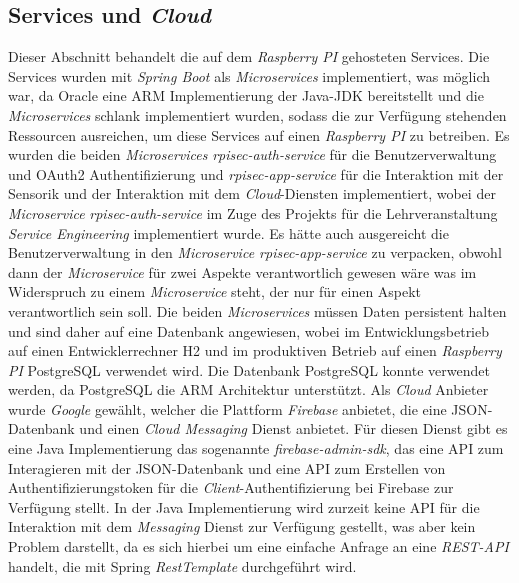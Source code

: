 \documentclass[]{article}
\begin{document}
\subsection{Services und \emph{Cloud}}
Dieser Abschnitt behandelt die auf dem \emph{Raspberry PI} gehosteten Services. Die Services wurden mit \emph{Spring Boot} als \emph{Microservices} implementiert, was möglich war, da Oracle eine ARM Implementierung der Java-JDK bereitstellt und die \emph{Microservices} schlank implementiert wurden, sodass die zur Verfügung stehenden Ressourcen ausreichen, um diese Services auf einen \emph{Raspberry PI} zu betreiben.
\newline
\newline
Es wurden die beiden \emph{Microservices} \emph{rpisec-auth-service} für die Benutzerverwaltung und OAuth2 Authentifizierung und \emph{rpisec-app-service} für die Interaktion mit der Sensorik und der Interaktion mit dem \emph{Cloud}-Diensten implementiert, wobei der \emph{Microservice} \emph{rpisec-auth-service} im Zuge des Projekts für die Lehrveranstaltung \emph{Service Engineering} implementiert wurde. Es hätte auch ausgereicht die Benutzerverwaltung in den \emph{Microservice rpisec-app-service} zu verpacken, obwohl dann der \emph{Microservice} für zwei Aspekte verantwortlich gewesen wäre was im Widerspruch zu einem \emph{Microservice} steht, der nur für einen Aspekt verantwortlich sein soll. 
\newline
\newline
Die beiden \emph{Microservices} müssen Daten persistent halten und sind daher auf eine Datenbank angewiesen, wobei im Entwicklungsbetrieb auf einen Entwicklerrechner H2 und im produktiven Betrieb auf einen \emph{Raspberry PI} PostgreSQL verwendet wird. Die Datenbank PostgreSQL konnte verwendet werden, da PostgreSQL die ARM Architektur unterstützt.
\newline
\newline
Als \emph{Cloud} Anbieter wurde \emph{Google} gewählt, welcher die Plattform \emph{Firebase} anbietet, die eine JSON-Datenbank und einen \emph{Cloud Messaging} Dienst anbietet. Für diesen Dienst gibt es eine Java Implementierung das sogenannte \emph{firebase-admin-sdk}, das eine API zum Interagieren mit der JSON-Datenbank und eine API zum Erstellen von Authentifizierungstoken für die \emph{Client}-Authentifizierung bei Firebase zur Verfügung stellt. In der Java Implementierung wird zurzeit keine API für die Interaktion mit dem \emph{Messaging} Dienst zur Verfügung gestellt, was aber kein Problem darstellt, da es sich hierbei um eine einfache Anfrage an eine \emph{REST-API} handelt, die mit Spring \emph{RestTemplate} durchgeführt wird.
\end{document}
